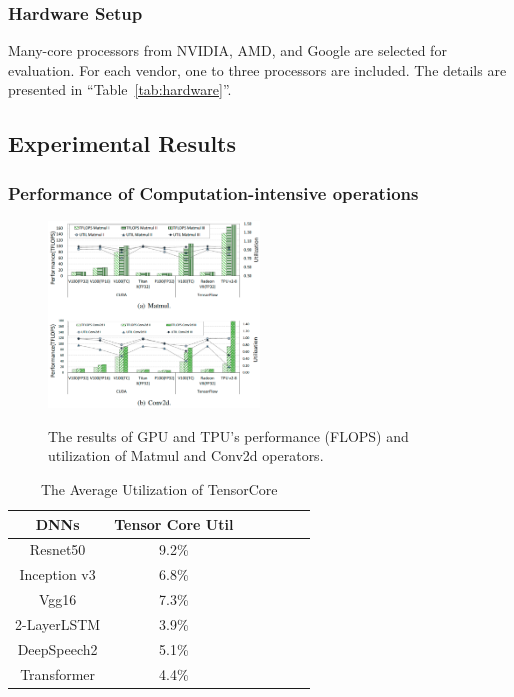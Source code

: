 \subsubsection{Hardware Setup}
Many-core processors from NVIDIA, AMD, and Google are selected for evaluation.
For each vendor, one to three processors are included.
The details are presented in ``Table~\ref{tab:hardware}''.

\subsection{Experimental Results}
\label{subsec:results}

\subsubsection{Performance of Computation-intensive operations}

\begin{figure}[htbp!]
    \centering
    {    \includegraphics[width=0.5\textwidth]{images/cios_gpu_tpu}}
    \caption{The results of GPU and TPU’s performance (FLOPS) and utilization of Matmul and Conv2d operators.}
    \label{fig:cios}
\end{figure}

\begin{table}[t]
    \setlength\tabcolsep{8pt}
    \caption{The Average Utilization of TensorCore}
    \centering
    \begin{tabular}{c c c c c c c}
        \toprule
        DNNs         & Tensor Core Util \\
        \midrule
        Resnet50     & 9.2\%            \\
        Inception v3 & 6.8\%            \\
        Vgg16        & 7.3\%            \\
        2-LayerLSTM  & 3.9\%            \\
        DeepSpeech2  & 5.1\%            \\
        Transformer  & 4.4\%            \\
        \bottomrule
    \end{tabular}\label{tab:tensorutil}
\end{table}

